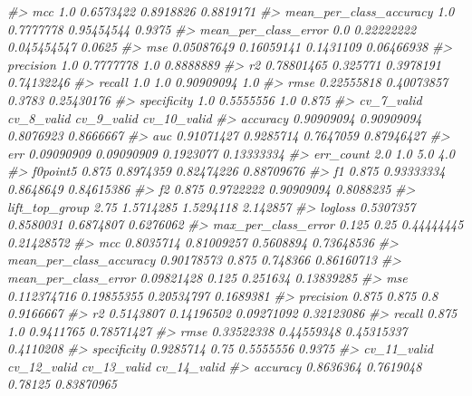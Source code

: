 \documentclass[]{book}
\newenvironment{Shaded}{\begin{snugshade}}{\end{snugshade}}
\newcommand{\CommentTok}[1]{\textcolor[rgb]{0.56,0.35,0.01}{\textit{#1}}}
\begin{document}
\begin{Shaded}
\begin{Highlighting}[]
{{{{{{\CommentTok{#> mcc                            1.0  0.6573422   0.8918826  0.8819171}
\CommentTok{#> mean_per_class_accuracy        1.0  0.7777778  0.95454544     0.9375}
\CommentTok{#> mean_per_class_error           0.0 0.22222222 0.045454547     0.0625}
\CommentTok{#> mse                     0.05087649 0.16059141   0.1431109 0.06466938}
\CommentTok{#> precision                      1.0  0.7777778         1.0  0.8888889}
\CommentTok{#> r2                      0.78801465   0.325771   0.3978191 0.74132246}
\CommentTok{#> recall                         1.0        1.0  0.90909094        1.0}
\CommentTok{#> rmse                    0.22555818 0.40073857      0.3783 0.25430176}
\CommentTok{#> specificity                    1.0  0.5555556         1.0      0.875}
\CommentTok{#>                          cv_7_valid cv_8_valid cv_9_valid cv_10_valid}
\CommentTok{#> accuracy                 0.90909094 0.90909094  0.8076923   0.8666667}
\CommentTok{#> auc                      0.91071427  0.9285714  0.7647059  0.87946427}
\CommentTok{#> err                      0.09090909 0.09090909  0.1923077  0.13333334}
\CommentTok{#> err_count                       2.0        1.0        5.0         4.0}
\CommentTok{#> f0point5                      0.875  0.8974359 0.82474226  0.88709676}
\CommentTok{#> f1                            0.875 0.93333334  0.8648649  0.84615386}
\CommentTok{#> f2                            0.875  0.9722222 0.90909094   0.8088235}
\CommentTok{#> lift_top_group                 2.75  1.5714285  1.5294118    2.142857}
\CommentTok{#> logloss                   0.5307357  0.8580031  0.6874807   0.6276062}
\CommentTok{#> max_per_class_error           0.125       0.25 0.44444445  0.21428572}
\CommentTok{#> mcc                       0.8035714 0.81009257  0.5608894  0.73648536}
\CommentTok{#> mean_per_class_accuracy  0.90178573      0.875   0.748366  0.86160713}
\CommentTok{#> mean_per_class_error     0.09821428      0.125   0.251634  0.13839285}
\CommentTok{#> mse                     0.112374716 0.19855355 0.20534797   0.1689381}
\CommentTok{#> precision                     0.875      0.875        0.8   0.9166667}
\CommentTok{#> r2                        0.5143807 0.14196502 0.09271092  0.32123086}
\CommentTok{#> recall                        0.875        1.0  0.9411765  0.78571427}
\CommentTok{#> rmse                     0.33522338 0.44559348 0.45315337   0.4110208}
\CommentTok{#> specificity               0.9285714       0.75  0.5555556      0.9375}
\CommentTok{#>                         cv_11_valid  cv_12_valid cv_13_valid cv_14_valid}
\CommentTok{#> accuracy                  0.8636364    0.7619048     0.78125  0.83870965}
}}}}}}
\end{Highlighting}
\end{Shaded}
\end{document}
